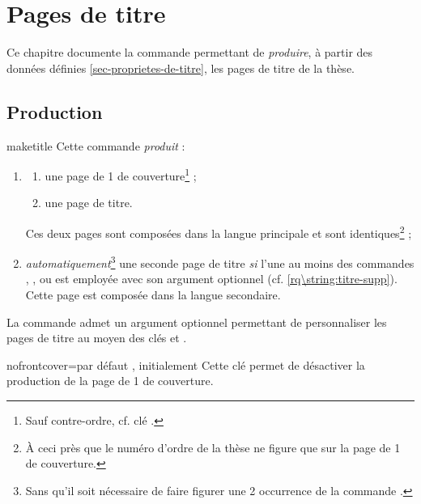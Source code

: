 \chapter{Pages de titre}\label{cha-pages-de-titre}

Ce chapitre documente la commande  permettant de
\emph{produire}, à partir des données définies \vref{sec-proprietes-de-titre},
les pages de titre de la thèse.

\section{Production}

\begin{docCommand}[doc description=\mandatory]{maketitle}{}
  Cette commande \emph{produit} :
  \begin{enumerate}
  \item
    \begin{enumerate}
    \item une page de 1\iere{} de couverture\footnote{Sauf contre-ordre,
        cf. clé .} ;
    \item une page de titre.
    \end{enumerate}
    Ces deux pages sont composées dans la langue principale et
    sont identiques\footnote{À ceci près que le numéro d'ordre de la thèse ne figure
      que sur la page de 1\iere{} de couverture.} ;
  \item \emph{automatiquement}\footnote{Sans qu'il soit nécessaire de faire
      figurer une 2\ieme{} occurrence de la commande .} une
    seconde page de titre \emph{si}  l'une au moins des
    commandes , ,  ou
     est employée avec son argument optionnel
    (cf. \vref{rq\string:titre-supp}). Cette page est composée dans la langue
    secondaire.
  \end{enumerate}
\end{docCommand}

La commande  admet un argument optionnel permettant de
personnaliser les pages de titre au moyen des clés  et
.%

\begin{docKey}{nofrontcover}{=\textbar{}}{par défaut
    , initialement }
  Cette clé permet de désactiver la production de la page de 1\iere{} de
  couverture.
\end{docKey}

